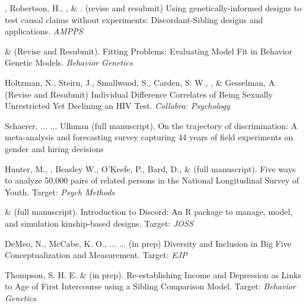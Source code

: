 

\item \meb, Robertson, H.\noteA, \jt, \& \joe. (revise and resubmit) Using genetically-informed designs to test causal claims without experiments: Discordant-Sibling designs and applications. \href{https://osf.io/zpdwt/}{\small\color{blue}{osf.io/zpdwt/}} \textit{AMPPS} %

\item \meb \& \joe (Revise and Resubmit). Fitting Problems: Evaluating Model Fit in Behavior Genetic Models. \textit{Behavior Genetics}
\item Holtzman, N., Steirn, J., Smallwood, S., Carden, S. W., \meb, \& Gesselman, A. (Revise and Resubmit) Individual Difference Correlates of Being Sexually Unrestricted Yet Declining an HIV Test. \textit{Collabra: Psychology}%


\item Schaerer, ... \meb ... Ulhman (full manuscript). On the trajectory of discrimination: A meta-analysis and forecasting survey capturing 44 years of field experiments on gender and hiring decisions

\item Hunter, M., \meb, Beasley W., O'Keefe, P.,  Bard, D., \& \Joe (full manuscript). Five ways to analyze 50,000 pairs of related persons in the National Longitudinal Survey of Youth.  Target: \textit{Psych Methods}

\item \jt \& \meb (full manuscript). Introduction to Discord: An R package to manage, model, and simulation kinship-based designs. Target: \textit{JOSS}
\item DeMeo, N., McCabe, K. O., ... \meb ... (in prep) Diversity and Inclusion in Big Five Conceptualization and Measurement.  Target: \textit{EJP}

\item Thompson, S. H. E. \noteA \& \meb (in prep). Re-establishing Income and Depression as Links to Age of First Intercourse using a Sibling Comparison Model. Target: \textit{Behavior Genetics}

